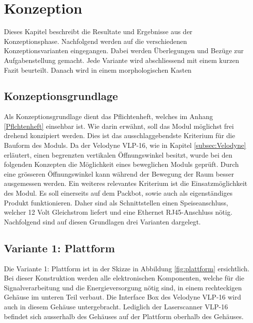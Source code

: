 \chapter{Konzeption}
\label{chap:Konzeption}
Dieses Kapitel beschreibt die Resultate und Ergebnisse aus der Konzeptionsphase. Nachfolgend werden auf die verschiedenen Konzeptionsvarianten eingegangen. Dabei werden Überlegungen und Bezüge zur Aufgabenstellung gemacht. Jede Variante wird abschliessend mit einem kurzen Fazit beurteilt. Danach wird in einem morphologischen Kasten 

\section{Konzeptionsgrundlage}
\label{sec:Konzeptiongrund}
Als Konzeptionsgrundlage dient das Pflichtenheft, welches im Anhang \ref{Pflchtenheft} einsehbar ist. Wie darin erwähnt, soll das Modul möglichst frei drehend konzipiert werden. Dies ist das ausschlaggebendste Kriterium für die Bauform des Moduls. Da der Velodyne VLP-16, wie in Kapitel \ref{subsec:Velodyne} erläutert, einen begrenzten vertikalen Öffnungswinkel besitzt, wurde bei den folgenden Konzepten die Möglichkeit eines beweglichen Moduls geprüft. Durch eine grösseren Öffnungswinkel kann während der Bewegung der Raum besser ausgemessen werden. Ein weiteres relevantes Kriterium ist die Einsatzmöglichkeit des Modul. Es soll einerseits auf dem Packbot, sowie auch als eigenständiges Produkt funktionieren. Daher sind als Schnittstellen einen Speiseanschluss, welcher 12 Volt Gleichstrom liefert und eine Ethernet RJ45-Anschluss nötig. Nachfolgend sind auf diesen Grundlagen drei Varianten dargelegt.

\section {Variante 1: Plattform}
\label{sec:var1}
Die Variante 1: Plattform ist in der Skizze in Abbildung \ref{fig:plattform} ersichtlich. Bei dieser Konstruktion werden alle elektronischen Komponenten, welche für die Signalverarbeitung und die Energieversorgung nötig sind, in einem rechteckigen Gehäuse im unteren Teil verbaut. Die Interface Box des Velodyne VLP-16 wird auch in diesem Gehäuse untergebracht. Lediglich der Laserscanner VLP-16 befindet sich ausserhalb des Gehäuses auf der Plattform oberhalb des Gehäuses.

